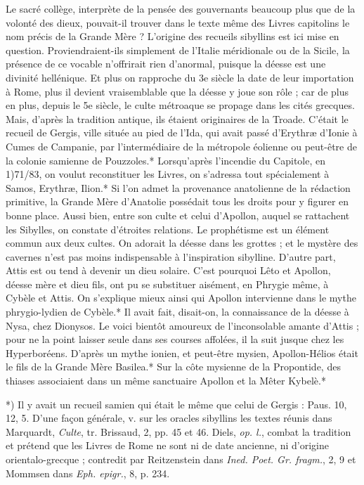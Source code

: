 \documentclass[a4paper, 11pt, oneside, polutonikogreek, french]{article}
\begin{document}
Le sacré collège, interprète de la pensée des gouvernants beaucoup plus que de la volonté des dieux, pouvait-il trouver dans le texte même des Livres capitolins le nom précis de la Grande Mère ? L'origine des recueils sibyllins est ici mise en question. Proviendraient-ils simplement de l'Italie méridionale ou de la Sicile, la présence de ce vocable n'offrirait rien d'anormal, puisque la déesse est une divinité hellénique. Et plus on rapproche du 3e siècle la date de leur importation à Rome, plus il devient vraisemblable que la déesse y joue son rôle ; car de plus en plus, depuis le 5e siècle, le culte métroaque se propage dans les cités grecques. Mais, d'après la tradition antique, ils étaient originaires de la Troade. C'était le recueil de Gergis, ville située au pied de l'Ida, qui avait passé d'Erythræ d'Ionie à Cumes de Campanie, par l'intermédiaire de la métropole éolienne ou peut-être de la colonie samienne de Pouzzoles.* Lorsqu'après l'incendie du Capitole, en 1)71/83, on voulut reconstituer les Livres, on s'adressa tout spécialement à Samos, Erythræ, Ilion.* Si l'on admet la provenance anatolienne de la rédaction primitive, la Grande Mère d'Anatolie possédait tous les droits pour y figurer en bonne place. Aussi bien, entre son culte et celui d'Apollon, auquel se rattachent les Sibylles, on constate d'étroites relations. Le prophétisme est un élément commun aux deux cultes. On adorait la déesse dans les grottes ; et le mystère des cavernes n'est pas moins indispensable à l'inspiration sibylline. D'autre part, Attis est ou tend à devenir un dieu solaire. C'est pourquoi Lêto et Apollon, déesse mère et dieu fils, ont pu se substituer aisément, en Phrygie même, à Cybèle et Attis. On s'explique mieux ainsi qui Apollon intervienne dans le mythe phrygio-lydien de Cybèle.* Il avait fait, disait-on, la connaissance de la déesse à Nysa, chez Dionysos. Le voici bientôt amoureux de l'inconsolable amante d'Attis ; pour ne la point laisser seule dans ses courses affolées, il la suit jusque chez les Hyperboréens. D'après un mythe ionien, et peut-être mysien, Apollon-Hélios était le fils de la Grande Mère Basilea.* Sur la côte mysienne de la Propontide, des thiases associaient dans un même sanctuaire Apollon et la Mêter Kybelè.*

*) Il y avait un recueil samien qui était le même que celui de Gergis : Paus. 10, 12, 5. D'une façon générale, v. sur les oracles sibyllins les textes réunis dans Marquardt, \emph{Culte}, tr. Brissaud, 2, pp. 45 et 46. Diels, \emph{op. l.}, combat la tradition et prétend que les Livres de Rome ne sont ni de date ancienne, ni d'origine orientalo-grecque ; contredit par Reitzenstein dans \emph{Ined. Poet. Gr. fragm.}, 2, 9 et Mommsen dans \emph{Eph. epigr.}, 8, p. 234.
\end{document}
